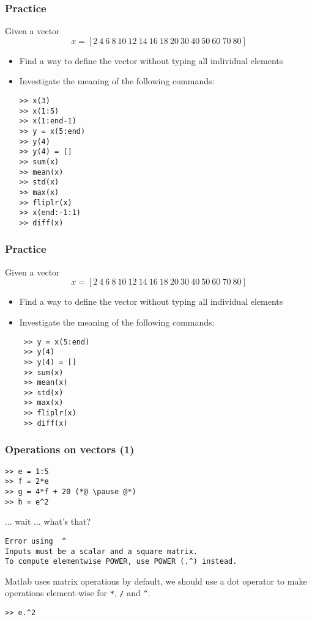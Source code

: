 \begin{frame}[fragile]
 \frametitle{Practice}
 Given a vector 
 \[ 
    x = \left[2 \ 4 \ 6 \ 8 \ 10 \ 12 \ 14 \ 16 \ 18 \ 20 \ 30 \ 40 \ 50 \ 60 \ 70 \ 80 \right]
 \]
 \begin{itemize}
  \item Find a way to define the vector without typing all individual elements\pause
  \item Investigate the meaning of the following commands:
  \begin{lstlisting}
>> x(3)
>> x(1:5)
>> x(1:end-1)
>> y = x(5:end)
>> y(4)
>> y(4) = []
>> sum(x)
>> mean(x)
>> std(x)
>> max(x)
>> fliplr(x)
>> x(end:-1:1)
>> diff(x)
  \end{lstlisting}
 \end{itemize}
\end{frame}

\begin{frame}[fragile]
  \frametitle{Practice}
  Given a vector 
  \[ 
     x = \left[2 \ 4 \ 6 \ 8 \ 10 \ 12 \ 14 \ 16 \ 18 \ 20 \ 30 \ 40 \ 50 \ 60 \ 70 \ 80 \right]
  \]
  \begin{itemize}
   \item Find a way to define the vector without typing all individual elements\pause
   \item Investigate the meaning of the following commands:
   \begin{lstlisting}
 >> y = x(5:end)
 >> y(4)
 >> y(4) = []
 >> sum(x)
 >> mean(x)
 >> std(x)
 >> max(x)
 >> fliplr(x)
 >> diff(x)
   \end{lstlisting}
  \end{itemize}
 \end{frame}

\begin{frame}[fragile]
  \frametitle{Operations on vectors (1)}
  \begin{lstlisting}
>> e = 1:5
>> f = 2*e
>> g = 4*f + 20 (*@ \pause @*)
>> h = e^2
  \end{lstlisting}\pause
  ... wait ... what's that?
  \begin{lstlisting}[basicstyle=\color{red}\footnotesize\ttfamily,keywordstyle={\color{red}}, identifierstyle=\color{red}]
Error using  ^ 
Inputs must be a scalar and a square matrix.
To compute elementwise POWER, use POWER (.^) instead.
  \end{lstlisting}\pause
  Matlab uses matrix operations by default, we should use a dot operator to make operations element-wise for \lstinline$*$, \lstinline$/$ and \lstinline$^$.
  \begin{lstlisting}
>> e.^2
  \end{lstlisting}
\end{frame}

